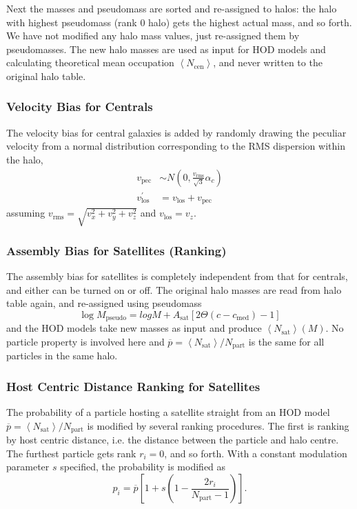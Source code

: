 \documentclass[fleqn,usenatbib]{mnras}
\begin{document}
			Next the masses and pseudomass are sorted and re-assigned to halos: the halo with highest pseudomass (rank 0 halo) gets the highest actual mass, and so forth. We have not modified any halo mass values, just re-assigned them by pseudomasses. The new halo masses are used as input for HOD models and calculating theoretical mean occupation $\left<N_\text{cen}\right>$, and never written to the original halo table.
			
		\subsubsection{Velocity Bias for Centrals}
		
			The velocity bias for central galaxies is added by randomly drawing the peculiar velocity from a normal distribution corresponding to the RMS dispersion within the halo,
			\begin{align}
				v_\text{pec} &\sim N(0, \frac{v_\text{rms}}{\sqrt{3}} \alpha_c) \\
				v_\text{los} ^\prime &= v_\text{los} + v_\text{pec}
			\end{align}
			assuming $v_\text{rms} = \sqrt{v_x^2 + v_y^2 + v_z^2}$ and $v_\text{los} = v_z$.
			
		\subsubsection{Assembly Bias for Satellites (Ranking)}
			
			The assembly bias for satellites is completely independent from that for centrals, and either can be turned on or off. The original halo masses are read from halo table again, and re-assigned using pseudomass
			\begin{equation}
				\log M_\text{pseudo} = log M + A_\text{sat} \left[ 2 \Theta(c-c_\text{med}) - 1 \right]
			\end{equation}
			and the HOD models take new masses as input and produce $\left<N_\text{sat}\right>(M)$. No particle property is involved here and $\overline{p} = \left< N_\text{sat} \right> / N_\text{part}$ is the same for all particles in the same halo.
			
		\subsubsection{Host Centric Distance Ranking for Satellites}
			
			The probability of a particle hosting a satellite straight from an HOD model $\overline{p} = \left<N_\text{sat}\right> / N_\text{part}$ is modified by several ranking procedures. The first is ranking by host centric distance, i.e. the distance between the particle and halo centre. The furthest particle gets rank $r_i=0$, and so forth. With a constant modulation parameter $s$ specified, the probability is modified as
			\begin{equation}
				p_i = \overline{p} \left[ 1 + s (1 - \frac{2 r_i}{N_\text{part} - 1}) \right] .
			\end{equation}
			
\end{document}
